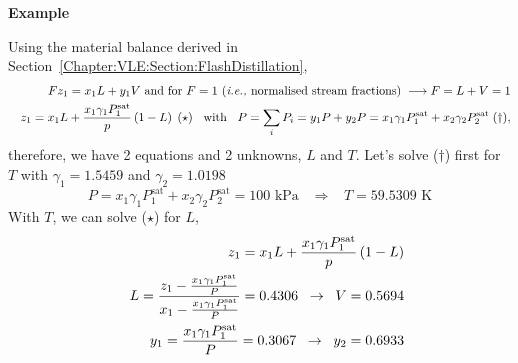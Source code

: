 \begin{MyExample}{\begin{center}{\bf Example}\end{center}}
 Using the material balance derived in Section~\ref{Chapter:VLE:Section:FlashDistillation},
\begin{eqnarray}
    && Fz_{1} = x_{1}L + y_{1}V\text{ and for } F=1 \text{ (\ie normalised stream fractions)}\;\longrightarrow F = L + V = 1 \nonumber \\
    && z_{1} = x_{1}L + \frc{x_{1}\gamma_{1}P_{1}^{\text{sat}}}{p}\left(1-L\right)\;(\star)\;\; \text{ with }\;\; P=\summation[P_{i}]{i}{} = y_{1}P + y_{2}P = x_{1}\gamma_{1}P_{1}^{\text{sat}} + x_{2}\gamma_{2}P_{2}^{\text{sat}}\;(\dagger),\nonumber
\end{eqnarray}
therefore, we have 2 equations and 2 unknowns, $L$ and $T$. Let's solve ($\dagger$) first for $T$ with $\gamma_{1}=1.5459$ and $\gamma_{2}=1.0198$
   \begin{displaymath}
       P = x_{1}\gamma_{1}P_{1}^{\text{sat}} + x_{2}\gamma_{2}P_{2}^{\text{sat}} = 100 \text{ kPa} \;\;\;\Rightarrow\;\;\; T = 59.5309\text{ K}
   \end{displaymath}
 With $T$, we can solve ($\star$) for $L$,
   \begin{eqnarray}
       && z_{1} = x_{1}L + \frc{x_{1}\gamma_{1}P_{1}^{\text{sat}}}{p}\left(1-L\right) \nonumber \\
       && L = \frc{z_{1} - \frac{x_{1}\gamma_{1}P_{1}^{\text{sat}}}{P}}{x_{1} - \frac{x_{1}\gamma_{1}P_{1}^{\text{sat}}}{P}} = 0.4306\;\;\rightarrow \;\; V = 0.5694 \nonumber \\
       && y_{1} = \frac{x_{1}\gamma_{1}P_{1}^{\text{sat}}}{P} = 0.3067\;\;\rightarrow \;\; y_{2} = 0.6933\nonumber
   \end{eqnarray}
   \end{MyExample} 

      
